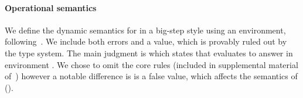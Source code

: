 \paragraph{Operational semantics} We define the dynamic semantics for \lambdatc{}
in a big-step style using an environment, following~\cite{TF10}.
We include both errors and a \wrong{} value, which is provably ruled out by the
type system.
The main judgment is 
which states that \e{} evaluates to answer  in environment
\openv{}. We chose to omit the core rules (included in supplemental material of~\cite{bonnaire2016practical})
however a notable difference is \nil{} is a false value, which affects the
semantics of \ifliteral{} ().


%
%
%


